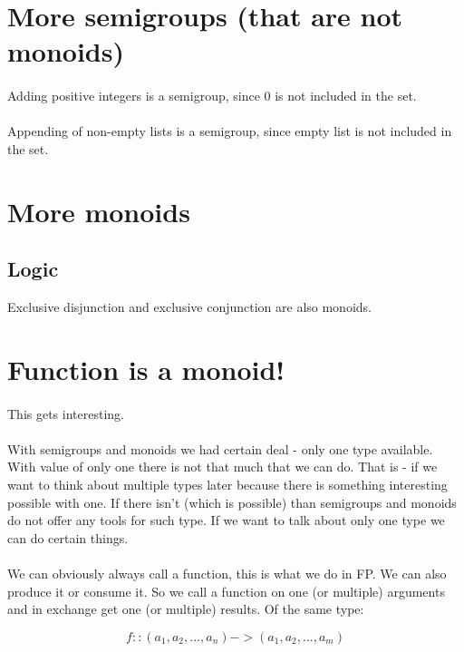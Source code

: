 \documentclass{article}
\begin{document}
    \section{More semigroups (that are not monoids)}

    \paragraph{}
    Adding positive integers is a semigroup, since $0$ is not included in the set.

    \paragraph{}
    Appending of non-empty lists is a semigroup, since empty list is not included in the set.

    \section{More monoids}

    \subsection{Logic}

    Exclusive disjunction and exclusive conjunction are also monoids.

    \newpage

    \section{Function is a monoid!}

    \paragraph{}
    This gets interesting. 
    \paragraph{}
    With semigroups and monoids we had certain deal - only one type available. With value of only one there is not that much that we can do. That is - if we want to think about multiple types later because there is something interesting possible with one. If there isn't (which is possible) than semigroups and monoids do not offer any tools for such type. If we want to talk about only one type we can do certain things.
    \paragraph{}
    We can obviously always call a function, this is what we do in FP. We can also produce it or consume it. So we call a function on one (or multiple) arguments and in exchange get one (or multiple) results. Of the same type:

    \begin{equation}
        f :: (a_1, a_2, ..., a_n) -> (a_1, a_2, ..., a_m)
    \end{equation}
\end{document}
